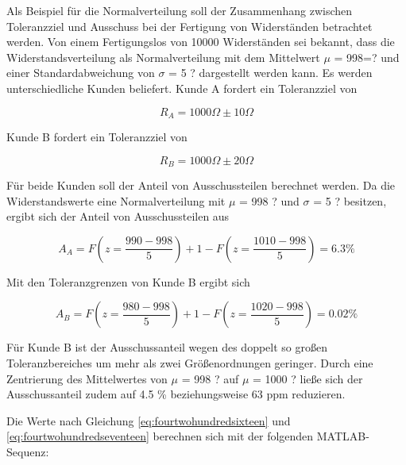 \noindent Als Beispiel f\"{u}r die Normalverteilung soll der Zusammenhang zwischen Toleranzziel und Ausschuss bei der Fertigung von Widerst\"{a}nden betrachtet werden. Von einem Fertigungslos von 10000 Widerst\"{a}nden sei bekannt, dass die Widerstandsverteilung als Normalverteilung mit dem Mittelwert $\mu$ = 998=? und einer Standardabweichung von $\sigma$ = 5 ? dargestellt werden kann. Es werden unterschiedliche Kunden beliefert. Kunde A fordert ein Toleranzziel von

\begin{equation}\label{eq:fourtwohundredfourteen}
R_{A} =1000 \Omega \pm 10 \Omega
\end{equation}

\noindent Kunde B fordert ein Toleranzziel von 

\begin{equation}\label{eq:fourtwohundredfifteen}
R_{B} =1000 \Omega \pm 20 \Omega
\end{equation}

\noindent F\"{u}r beide Kunden soll der Anteil von Ausschussteilen berechnet werden. Da die Widerstandswerte eine Normalverteilung mit $\mu$ = 998 ? und $\sigma$ = 5 ? besitzen, ergibt sich der Anteil von Ausschussteilen aus

\begin{equation}\label{eq:fourtwohundredsixteen}
A_{A} =F\left(z=\dfrac{990-998}{5} \right)+1-F\left(z=\dfrac{1010-998}{5} \right)=6.3 \%
\end{equation}

\noindent Mit den Toleranzgrenzen von Kunde B ergibt sich

\begin{equation}\label{eq:fourtwohundredseventeen}
A_{B} =F\left(z=\dfrac{980-998}{5} \right)+1-F\left(z=\dfrac{1020-998}{5} \right)=0.02 \%
\end{equation}

\noindent F\"{u}r Kunde B ist der Ausschussanteil wegen des doppelt so gro{\ss}en Toleranzbereiches um mehr als zwei Gr\"{o}{\ss}enordnungen geringer. Durch eine Zentrierung des Mittelwertes von $\mu$ = 998 ? auf $\mu$ = 1000 ? lie{\ss}e sich der Ausschussanteil zudem auf 4.5 \% beziehungsweise 63 ppm reduzieren.

\noindent Die Werte nach Gleichung \eqref{eq:fourtwohundredsixteen} und \eqref{eq:fourtwohundredseventeen} berechnen sich mit der folgenden MATLAB-Sequenz:

\clearpage



